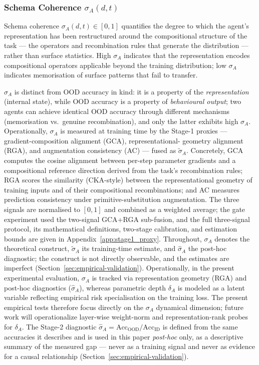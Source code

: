 \documentclass{article}
\theoremstyle{definition}
\begin{document}
\subsubsection{Schema Coherence \texorpdfstring{$\sigma_A(d,t)$}{sigma\_A(d,t)}}\label{sec:schema-coherence}

Schema coherence $\sigma_A(d,t) \in [0,1]$ quantifies the degree to
which the agent's representation has been restructured around the
compositional structure of the task --- the operators and recombination
rules that generate the distribution --- rather than surface statistics.
High $\sigma_A$ indicates that the representation encodes compositional
operators applicable beyond the training distribution; low $\sigma_A$
indicates memorisation of surface patterns that fail to transfer.

$\sigma_A$ is distinct from OOD accuracy in kind: it is a property of
the \emph{representation} (internal state), while OOD accuracy is a
property of \emph{behavioural output}; two agents can achieve identical
OOD accuracy through different mechanisms (memorisation vs.\ genuine
recombination), and only the latter exhibits high $\sigma_A$.
Operationally, $\sigma_A$ is measured at training time by the Stage-1
proxies --- gradient-composition alignment (GCA), representational-
geometry alignment (RGA), and augmentation consistency (AC) --- fused as
$\tilde{\sigma}_A$. Concretely, GCA computes the cosine alignment
between per-step parameter gradients and a compositional reference
direction derived from the task's recombination rules; RGA scores the
similarity (CKA-style) between the representational geometry of
training inputs and of their compositional recombinations; and AC
measures prediction consistency under primitive-substitution
augmentation. The three signals are normalised to $[0,1]$ and combined
as a weighted average; the gate experiment used the two-signal GCA+RGA
sub-fusion, and the full three-signal protocol, its mathematical definitions,
two-stage calibration, and estimation bounds are given in Appendix~\ref{app:stage1_proxy}.
Throughout, $\sigma_A$ denotes the theoretical construct, $\tilde{\sigma}_A$
its training-time estimate, and $\hat{\sigma}_A$ the post-hoc diagnostic;
the construct is not directly observable, and the estimates are
imperfect (Section~\ref{sec:empirical-validation}). Operationally, in the present experimental evaluation, $\sigma_A$ is tracked via representation geometry (RGA) and post-hoc diagnostics ($\hat{\sigma}_A$), whereas parametric depth $\delta_A$ is modeled as a latent variable reflecting empirical risk specialisation on the training loss. The present empirical tests therefore focus directly on the $\sigma_A$ dynamical dimension; future work will operationalize layer-wise weight-norm and representation-rank probes for $\delta_A$. The Stage-2 diagnostic
$\hat{\sigma}_A = \text{Acc}_{\text{OOD}}/\text{Acc}_{\text{ID}}$ is
defined from the same accuracies it describes and is used in this paper
\emph{post-hoc} only, as a descriptive summary of the measured gap ---
never as a training signal and never as evidence for a causal
relationship (Section~\ref{sec:empirical-validation}).
\end{document}

